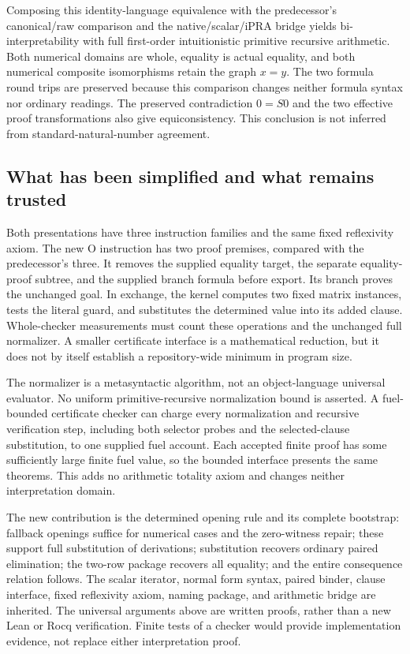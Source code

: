 \documentclass[11pt,letterpaper]{article}
\theoremstyle{definition}
\begin{document}
Composing this identity-language equivalence with the predecessor's
canonical/raw comparison and the native/scalar/iPRA bridge yields
bi-interpretability with full first-order intuitionistic primitive recursive
arithmetic.  Both numerical domains are whole, equality is actual equality,
and both numerical composite isomorphisms retain the graph $x=y$.
The two formula round trips are preserved because this comparison changes
neither formula syntax nor ordinary readings.  The preserved contradiction
$0=S0$ and the two effective proof transformations also give equiconsistency.
This conclusion is not inferred from standard-natural-number agreement.

\subsection{What has been simplified and what remains trusted}

Both presentations have three instruction families and the same fixed
reflexivity axiom.  The new O instruction has two proof premises, compared
with the predecessor's three.  It removes the supplied equality target,
the separate equality-proof subtree, and the supplied branch formula
before export.  Its branch proves the unchanged goal.  In exchange, the
kernel computes two fixed matrix instances, tests the literal guard, and
substitutes the determined value into its added clause.  Whole-checker
measurements must count these operations and the unchanged full normalizer.
A smaller certificate interface is a mathematical reduction, but it does
not by itself establish a repository-wide minimum in program size.

The normalizer is a metasyntactic algorithm, not an object-language
universal evaluator.  No uniform primitive-recursive normalization bound
is asserted.  A fuel-bounded certificate checker can charge every
normalization and recursive verification step, including both selector
probes and the selected-clause substitution, to one supplied fuel account.
Each accepted finite proof has some sufficiently large finite fuel value,
so the bounded interface presents the same theorems.  This adds no
arithmetic totality axiom and changes neither interpretation domain.

The new contribution is the determined opening rule and its complete
bootstrap: fallback openings suffice for numerical cases and the
zero-witness repair; these support full substitution of derivations;
substitution recovers ordinary paired elimination; the two-row package
recovers all equality; and the entire consequence relation follows.
The scalar iterator, normal form syntax, paired binder, clause interface,
fixed reflexivity axiom, naming package, and arithmetic bridge are inherited.
The universal arguments above are written proofs, rather than a new
Lean or Rocq verification.  Finite tests of a checker would provide
implementation evidence, not replace either interpretation proof.
\end{document}

